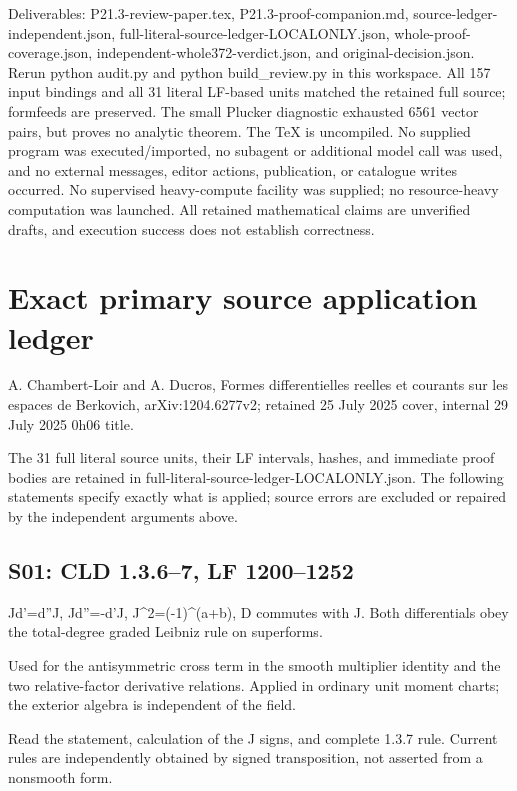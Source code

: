 \documentclass[11pt]{article}
\begin{document}
Deliverables: P21.3-review-paper.tex, P21.3-proof-companion.md, source-ledger-independent.json, full-literal-source-ledger-LOCALONLY.json, whole-proof-coverage.json, independent-whole372-verdict.json, and original-decision.json. Rerun python audit.py and python build\_review.py in this workspace. All 157 input bindings and all 31 literal LF-based units matched the retained full source; formfeeds are preserved. The small Plucker diagnostic exhausted 6561 vector pairs, but proves no analytic theorem. The TeX is uncompiled. No supplied program was executed/imported, no subagent or additional model call was used, and no external messages, editor actions, publication, or catalogue writes occurred. No supervised heavy-compute facility was supplied; no resource-heavy computation was launched. All retained mathematical claims are unverified drafts, and execution success does not establish correctness.

\section{Exact primary source application ledger}

A. Chambert-Loir and A. Ducros, Formes differentielles reelles et courants sur les espaces de Berkovich, arXiv:1204.6277v2; retained 25 July 2025 cover, internal 29 July 2025 0h06 title.

The 31 full literal source units, their LF intervals, hashes, and immediate proof bodies are retained in full-literal-source-ledger-LOCALONLY.json. The following statements specify exactly what is applied; source errors are excluded or repaired by the independent arguments above.


\subsection*{S01: CLD 1.3.6--7, LF 1200--1252}

Jd'=d''J, Jd''=-d'J, J\textasciicircum{}2=(-1)\textasciicircum{}(a+b), D commutes with J. Both differentials obey the total-degree graded Leibniz rule on superforms.

Used for the antisymmetric cross term in the smooth multiplier identity and the two relative-factor derivative relations. Applied in ordinary unit moment charts; the exterior algebra is independent of the field.

Read the statement, calculation of the J signs, and complete 1.3.7 rule. Current rules are independently obtained by signed transposition, not asserted from a nonsmooth form.
\end{document}
